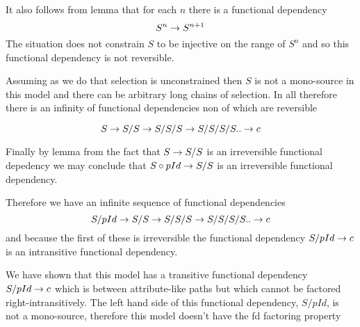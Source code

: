 It also follows from lemma  that for each $n$ there is a functional dependency
\begin{equation}
\label{tspSnn1}
S^n \rightarrow S^{n+1}
\end{equation}
The situation does not constrain $S$ to be injective on the range of $S^n$ and so this functional dependency is not reversible.

Assuming as we do that selection is unconstrained then $S$ is not a mono-source in this model and there can be arbitrary long chains of selection.
In  all therefore there is an infinity of functional dependencies non of which are reversible

\begin{equation}
S \rightarrow S/S \rightarrow S/S/S \rightarrow S/S/S/S .. \rightarrow c
\end{equation}

Finally by lemma  from the fact that $S \rightarrow S/S$  is an irreversible functional depedency
we may conclude that $S \circ pId \rightarrow S/S$ is an irreversible functional dependency.

Therefore we have an infinite sequence of functional dependencies
\begin{equation}
S/pId \rightarrow S/S \rightarrow S/S/S \rightarrow S/S/S/S .. \rightarrow c
\end{equation}
and because the first of these is irreversible
the functional dependency
$S/pId \rightarrow c $ 
is an intransitive functional dependency.

We have shown that this model has a transitive functional dependency $S/pId \rightarrow c$ which is between
attribute-like paths but which cannot be factored right-intransitively. The left hand side of this functional dependency, $S/pId$, is not a mono-source, therefore this model doesn't have the fd factoring property 

